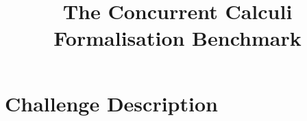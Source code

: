 \documentclass[runningheads]{llncs}
\begin{document}
\title{The Concurrent Calculi Formalisation Benchmark}
\author{}
\date{}
\institute{}


\maketitle

\section{Challenge Description}\label{app:challenges}




\end{document}
